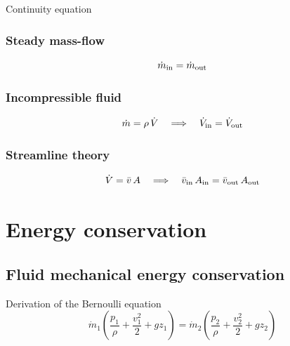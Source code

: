 \documentclass{article}
\begin{document}
\begin{multicols}{2}
\begin{theorybox}{Continuity equation}
    \subsubsection{Steady mass-flow}
    \begin{equation}
    \dot m_{\rm in} = \dot m_{\rm out}
    \end{equation}

    \subsubsection{Incompressible fluid}
    \begin{equation}
    \dot m = \rho\,\dot V
    \quad\Longrightarrow\quad
    \dot V_{\rm in} = \dot V_{\rm out}
    \end{equation}

    \subsubsection{Streamline theory}
    \begin{equation}
    \dot V = \bar v\,A
    \quad\Longrightarrow\quad
    \bar v_{\rm in}\,A_{\rm in} = \bar v_{\rm out}\,A_{\rm out}
    \end{equation}
\end{theorybox}

\section{Energy conservation}
\subsection{Fluid mechanical energy conservation}
\begin{theorybox}{Derivation of the Bernoulli equation}
    \begin{equation}
        \dot{m}_1 \left(\dfrac{p_1}{\rho} + \dfrac{v_1^2}{2} + gz_1\right) = \dot{m}_2 \left(\dfrac{p_2}{\rho} + \dfrac{v_2^2}{2} + gz_2\right)
    \end{equation}

\end{theorybox}
\end{multicols}
\end{document}

